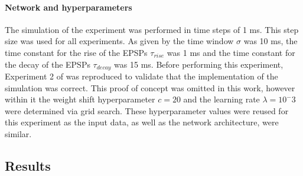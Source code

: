 \paragraph{Network and hyperparameters}

The simulation of the experiment was performed in time steps of 1 ms. This step size was used for all experiments. As given by \citet{nessler} the time window $\sigma$ was 10 ms, the time constant for the rise of the EPSPs $\tau_{rise}$ was 1 ms and the time constant for the decay of the EPSPs $\tau_{decay}$ was 15 ms. Before performing this experiment, Experiment 2 of \citet{nessler} was reproduced to validate that the implementation of the simulation was correct. This proof of concept was omitted in this work, however within it the weight shift hyperparameter $c = 20$ and the learning rate $\lambda = 10^-3$ were determined via grid search. These hyperparameter values were reused for this experiment as the input data, as well as the network architecture, were similar.

\subsection{Results}

